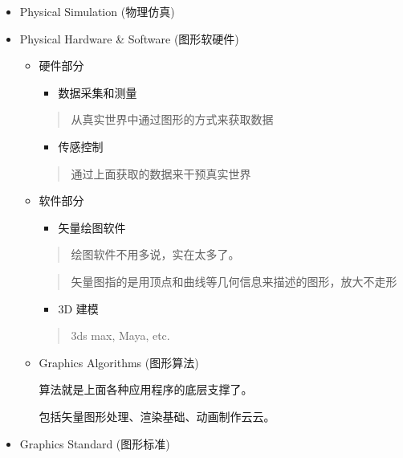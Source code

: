 \documentclass[
]{article}
\begin{document}
\begin{itemize}
\item
  Physical Simulation (物理仿真)
\item
  Physical Hardware \& Software (图形软硬件)

  \begin{itemize}
  \item
    硬件部分

    \begin{itemize}
    \item
      数据采集和测量
    \end{itemize}

    \begin{quote}
    从真实世界中通过图形的方式来获取数据
    \end{quote}

    \begin{itemize}
    \item
      传感控制
    \end{itemize}

    \begin{quote}
    通过上面获取的数据来干预真实世界
    \end{quote}
  \item
    软件部分

    \begin{itemize}
    \item
      矢量绘图软件
    \end{itemize}

    \begin{quote}
    绘图软件不用多说，实在太多了。
    \end{quote}

    \begin{quote}
    矢量图指的是用顶点和曲线等几何信息来描述的图形，放大不走形
    \end{quote}

    \begin{itemize}
    \item
      3D 建模
    \end{itemize}

    \begin{quote}
    3ds max, Maya, etc.
    \end{quote}
  \item
    Graphics Algorithms (图形算法)

    算法就是上面各种应用程序的底层支撑了。

    包括矢量图形处理、渲染基础、动画制作云云。
  \end{itemize}
\item
  Graphics Standard (图形标准)
\end{itemize}
\end{document}
